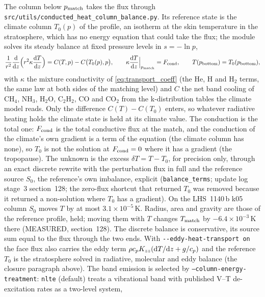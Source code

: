 The column below $p_{\rm match}$ takes the flux through
\texttt{src/utils/conducted\_heat\_column\_balance.py}. Its reference state
is the climate column $T_0(p)$ of the profile, an isotherm at the skin
temperature in the stratosphere, which has no energy equation that could
take the flux; the module solves its steady balance at fixed pressure
levels in $s = -\ln p$,
\begin{equation}
\frac{1}{r^2}\frac{\rm d}{{\rm d}z}\Bigl(r^2\kappa\frac{{\rm d}T}{{\rm d}z}\Bigr)
 = C(T,p) - C\bigl(T_0(p),p\bigr),
\qquad
\kappa\frac{{\rm d}T}{{\rm d}z}\Big|_{p_{\rm match}} = F_{\rm cond},
\qquad
T(p_{\rm bottom}) = T_0(p_{\rm bottom}),
\label{eq:mol:columnbalance}
\end{equation}
with $\kappa$ the mixture conductivity of \eqref{eq:transport_coeff} (the
He, H and H$_2$ terms, the same law at both sides of the matching level) and
$C$ the net band cooling of CH$_4$, NH$_3$, H$_2$O, C$_2$H$_2$, CO and CO$_2$
from the k-distribution tables the climate model reads. Only the difference
$C(T)-C(T_0)$ enters, so whatever radiative heating holds the climate state
is held at its climate value. The conduction is the total one: $F_{\rm cond}$
is the total conductive flux at the match, and the conduction of the
climate's own gradient is a term of the equation (the climate column has
none), so $T_0$ is not the solution at $F_{\rm cond}=0$ where it has a
gradient (the tropopause). The unknown is the excess $\delta T=T-T_0$, for
precision only, through an exact discrete rewrite with the perturbation flux
in full and the reference source $S_0$, the reference's own imbalance,
explicit (\texttt{balance\_terms}; update log stage~3 section~128; the
zero-flux shortcut that returned $T_0$ was removed because it returned a
non-solution where $T_0$ has a gradient). On the LHS~1140\,b k05 column
$S_0$ moves $T$ by at most $3.1\times10^{-5}$\,K. Radius, area and gravity
are those of the reference profile, held; moving them with $T$ changes
$T_{\rm match}$ by $-6.4\times10^{-3}$\,K there (MEASURED, section~128). The
discrete balance is conservative, its source sum equal to the flux through
the two ends. With \texttt{-{}-eddy-heat-transport on} the face flux also
carries the eddy term $\rho c_pK_{zz}({\rm d}T/{\rm d}z+g/c_p)$ and the
reference $T_0$ is the stratosphere solved in radiative, molecular and eddy
balance (the closure paragraph above). The band emission is selected by \texttt{--column-energy-treatment}:
\texttt{nlte} (default) treats a vibrational band with published V--T
de-excitation rates as a two-level system,
